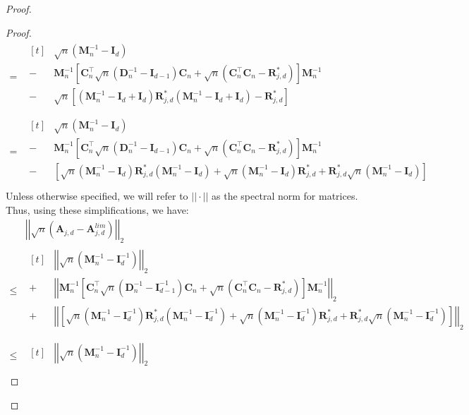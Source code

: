 \documentclass[
  12pt]{article}
\newcommand{\bR}{\boldsymbol{R}}
\newcommand{\bD}{\boldsymbol{D}}
\newcommand{\bM}{\boldsymbol{M}}
\newcommand{\bA}{\boldsymbol{A}}
\newcommand{\bC}{\boldsymbol{C}}
\newcommand{\bI}{\boldsymbol{I}}
\begin{document}
\begin{proof}
\begin{proof}
\begin{equation}
\begin{split}
    = & \!\begin{aligned}[t]
        & \sqrt{n}\left(\bM_n^{-1} - \bI_d\right)\\
        - & \bM_n^{-1}\left[\bC_n^\top \sqrt{n}(\bD_n^{-1} - \bI_{d-1}) \bC_n + \sqrt{n}(\bC_n^\top\bC_n - \bR^*_{j,d})\right]\bM_n^{-1}\\
        - &\sqrt{n}\left[(\bM_n^{-1}-\bI_d + \bI_d)\bR^*_{j,d}(\bM_n^{-1}-\bI_d + \bI_d) - \bR^*_{j,d}\right] \\
    \end{aligned}\\
    = & \!\begin{aligned}[t]
        & \sqrt{n}\left(\bM_n^{-1} - \bI_d\right)\\
        - & \bM_n^{-1}\left[\bC_n^\top \sqrt{n}(\bD_n^{-1} - \bI_{d-1}) \bC_n + \sqrt{n}(\bC_n^\top\bC_n - \bR^*_{j,d})\right]\bM_n^{-1}\\
        - &\left[\sqrt{n}(\bM_n^{-1}-\bI_d)\bR^*_{j,d}(\bM_n^{-1}-\bI_d)+\sqrt{n}(\bM_n^{-1}-\bI_d)\bR^*_{j,d} + \bR^*_{j,d}\sqrt{n}(\bM_n^{-1}-\bI_d)\right] \\
    \end{aligned}
    \end{split}    
\end{equation}
Unless otherwise specified, we will refer to $||\cdot||$ as the spectral norm for matrices. Thus, using these simplifications, we have:
\begin{equation}
    \begin{split}
        & \left|\left|\sqrt{n}\left(\bA_{j,d} - \bA^{lim}_{j,d}\right)\right|\right|_2\\
        \leq & \!\begin{aligned}[t]
        & \left|\left|\sqrt{n}\left(\bM_n^{-1} - \bI^{-1}_d\right)\right|\right|_2\\
        + & \left|\left|\bM_n^{-1}\left[\bC_n^\top \sqrt{n}(\bD_n^{-1} - \bI^{-1}_{d-1}) \bC_n + \sqrt{n}(\bC_n^\top\bC_n - \bR^*_{j,d})\right]\bM_n^{-1}\right|\right|_2\\
        + &
        \left|\left|\left[\sqrt{n}(\bM_n^{-1}-\bI^{-1}_d)\bR^*_{j,d}(\bM_n^{-1}-\bI^{-1}_d)+\sqrt{n}(\bM_n^{-1}-\bI^{-1}_d)\bR^*_{j,d} + \bR^*_{j,d}\sqrt{n}(\bM_n^{-1}-\bI^{-1}_d)\right] \right|\right|_2\\
        \end{aligned}\\
        \leq & \!\begin{aligned}[t]
        & \left|\left|\sqrt{n}\left(\bM_n^{-1} - \bI^{-1}_d\right)\right|\right|_2\\

\end{aligned}
\end{split}
\end{equation}
\end{proof}
\end{proof}
\end{document}
